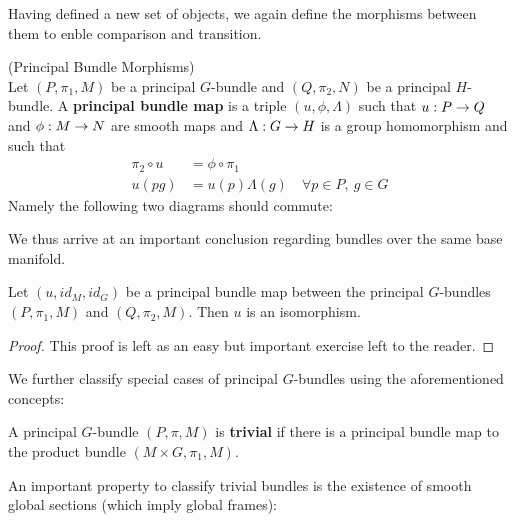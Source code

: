 Having defined a new set of objects, we again define the morphisms between them to enble comparison and transition.

\begin{definition} (Principal Bundle Morphisms)\\
  Let $(P,\pi_1,M)$ be a principal $G$-bundle and $(Q,\pi_2, N)$ be a principal $H$-bundle. A \textbf{principal bundle map} is a triple $(u, \phi, \Lambda)$ such that $u: P \rightarrow Q$ and $\phi: M \ra N$ are smooth maps and $\Lambda: G \rightarrow H$ is a group homomorphism and such that
  \begin{align*}
    \pi_2 \circ u &= \phi \circ \pi_1\\
    u(pg) &= u(p) \Lambda(g) \quad \forall p \in P, \ g\in G
  \end{align*}
  Namely the following two diagrams should commute:
\end{definition}

We thus arrive at an important conclusion regarding bundles over the same base manifold.

\begin{theo}
  Let $(u,id_M,id_G)$ be a principal bundle map between the principal $G$-bundles $(P,\pi_1,M)$ and $(Q,\pi_2,M)$. Then $u$ is an isomorphism.
\begin{proof}
  This proof is left as an easy but important exercise left to the reader.
\end{proof}
\end{theo}

We further classify special cases of principal $G$-bundles using the aforementioned concepts:

\begin{definition}
  A principal $G$-bundle $(P,\pi,M)$ is \textbf{trivial} if there is a principal bundle map to the product bundle $(M\times G, \pi_1, M)$.
\end{definition}

An important property to classify trivial bundles is the existence of smooth global sections (which imply global frames):

